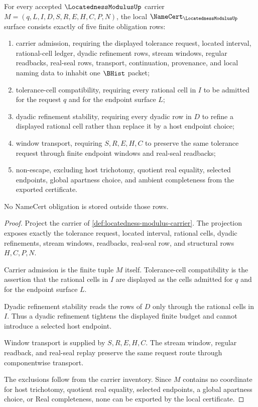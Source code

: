 \begin{theorem}
\label{thm:locatedness-modulus-namecert-obligations}
For every accepted $\LocatednessModulusUp$ carrier $M=(q,L,I,D,S,R,E,H,C,P,N)$, the local $\NameCert_{\LocatednessModulusUp}$ surface consists exactly of five finite obligation rows:
\begin{enumerate}
\item carrier admission, requiring the displayed tolerance request, located interval, rational-cell ledger, dyadic refinement rows, stream windows, regular readbacks, real-seal rows, transport, continuation, provenance, and local naming data to inhabit one $\BHist$ packet;
\item tolerance-cell compatibility, requiring every rational cell in $I$ to be admitted for the request $q$ and for the endpoint surface $L$;
\item dyadic refinement stability, requiring every dyadic row in $D$ to refine a displayed rational cell rather than replace it by a host endpoint choice;
\item window transport, requiring $S,R,E,H,C$ to preserve the same tolerance request through finite endpoint windows and real-seal readbacks;
\item non-escape, excluding host trichotomy, quotient real equality, selected endpoints, global apartness choice, and ambient completeness from the exported certificate.
\end{enumerate}
No NameCert obligation is stored outside those rows.
\end{theorem}
\begin{proof}
Project the carrier of \autoref{def:locatedness-modulus-carrier}. The projection exposes exactly the tolerance request, located interval, rational cells, dyadic refinements, stream windows, readbacks, real-seal row, and structural rows $H,C,P,N$.

Carrier admission is the finite tuple $M$ itself. Tolerance-cell compatibility is the assertion that the rational cells in $I$ are displayed as the cells admitted for $q$ and for the endpoint surface $L$.

Dyadic refinement stability reads the rows of $D$ only through the rational cells in $I$. Thus a dyadic refinement tightens the displayed finite budget and cannot introduce a selected host endpoint.

Window transport is supplied by $S,R,E,H,C$. The stream window, regular readback, and real-seal replay preserve the same request route through componentwise transport.

The exclusions follow from the carrier inventory. Since $M$ contains no coordinate for host trichotomy, quotient real equality, selected endpoints, a global apartness choice, or Real completeness, none can be exported by the local certificate.
\end{proof}

